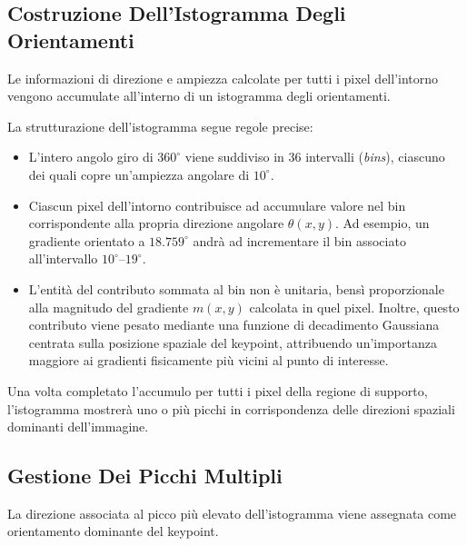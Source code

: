 ﻿\documentclass[11pt, a4paper]{article}
\begin{document}
\subsection{Costruzione Dell'Istogramma Degli Orientamenti}

Le informazioni di direzione e ampiezza calcolate per tutti i pixel dell'intorno vengono accumulate all'interno di un istogramma degli orientamenti.


La strutturazione dell'istogramma segue regole precise:
\begin{itemize}
    \item L'intero angolo giro di $360^{\circ}$ viene suddiviso in 36 intervalli (\emph{bins}), ciascuno dei quali copre un'ampiezza angolare di $10^{\circ}$.
    \item Ciascun pixel dell'intorno contribuisce ad accumulare valore nel bin corrispondente alla propria direzione angolare $\theta(x, y)$. Ad esempio, un gradiente orientato a $18.759^{\circ}$ andrà ad incrementare il bin associato all'intervallo $10^{\circ}$–$19^{\circ}$.
    \item L'entità del contributo sommata al bin non è unitaria, bensì proporzionale alla magnitudo del gradiente $m(x, y)$ calcolata in quel pixel. Inoltre, questo contributo viene pesato mediante una funzione di decadimento Gaussiana centrata sulla posizione spaziale del keypoint, attribuendo un'importanza maggiore ai gradienti fisicamente più vicini al punto di interesse.
\end{itemize}

Una volta completato l'accumulo per tutti i pixel della regione di supporto, l'istogramma mostrerà uno o più picchi in corrispondenza delle direzioni spaziali dominanti dell'immagine.

\subsection{Gestione Dei Picchi Multipli}

La direzione associata al picco più elevato dell'istogramma viene assegnata come orientamento dominante del keypoint.

\end{document}
